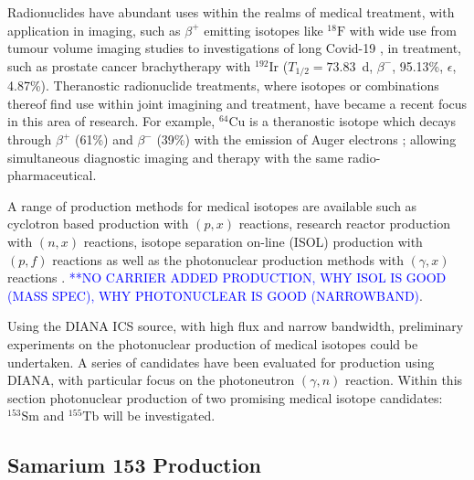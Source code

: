 \documentclass[../main.tex]{subfiles}
\begin{document}
Radionuclides have abundant uses within the realms of medical treatment, with application in imaging, such as $\beta^{+}$ emitting isotopes like $^{18}\mathrm{F}$ with wide use from tumour volume imaging studies \cite{rocha2021metabolic} to investigations of long Covid-19 \cite{sollini2021long}, in treatment, such as prostate cancer brachytherapy \cite{yuan2021proof} with $^{192}\textrm{Ir}$ ($T_{1/2} =73.83$~\si{\day}, $\beta^{-}$, 95.13\%, $\epsilon$, 4.87\%). Theranostic \cite{svenson2013theranostics} radionuclide treatments, where isotopes or combinations thereof find use within joint imagining and treatment, have became a recent focus in this area of research. For example, $^{64}\mathrm{Cu}$ is a theranostic isotope which decays through $\beta^{+}$ (61\%) and $\beta^{-}$ (39\%) with the emission of Auger electrons \cite{boschi2018emerging}; allowing simultaneous diagnostic imaging and therapy with the same radio-pharmaceutical.

A range of production methods for medical isotopes are available such as cyclotron based production \cite{} with $\left(p,x\right)$ reactions, research reactor production \cite{} with $\left(n,x\right)$ reactions, isotope separation on-line (ISOL) production with $\left(p,f\right)$ reactions \cite{} as well as the photonuclear production methods with $\left(\gamma,x\right)$ reactions \cite{habs2011production}. \textcolor{blue}{**NO CARRIER ADDED PRODUCTION, WHY ISOL IS GOOD (MASS SPEC), WHY PHOTONUCLEAR IS GOOD (NARROWBAND)}. 

Using the DIANA ICS source, with high flux and narrow bandwidth, preliminary experiments on the photonuclear production of medical isotopes could be undertaken. A series of candidates have been evaluated for production using DIANA, with particular focus on the photoneutron $\left(\gamma,n\right)$ reaction. Within this section photonuclear production of two promising medical isotope candidates: $^{153}\mathrm{Sm}$ and $^{155}\mathrm{Tb}$ will be investigated.  

\subsection{Samarium 153 Production}
\end{document}

